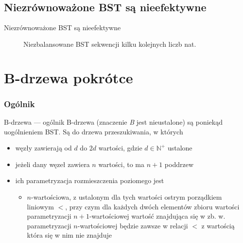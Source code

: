 \documentclass{beamer}
\begin{document}
\subsection{Niezrównoważone BST są nieefektywne}

\begin{frame}{Niezrównoważone BST są nieefektywne}
\begin{figure}
\caption{\label{fig:sequenceunbalancedbst}
Niezbalansowane BST sekwencji kilku kolejnych liczb nat.}
\end{figure}
\end{frame}

\section{B-drzewa pokrótce}

\subsubsection{Ogólnik}

\begin{frame}{B-drzewa --- ogólnik}
	B-drzewa (znaczenie \textit{B} jest nieustalone) są poniekąd uogólnieniem BST.
    Są do drzewa przeszukiwania, w których
    \begin{itemize}
    	\item węzły zawierają od $d$ do $2d$ wartości, gdzie $d\in\mathbb{N}^+$ ustalone
        \item jeżeli dany węzeł zawiera $n$ wartości, to ma $n+1$ poddrzew
        \item ich parametryzacja rozmieszczenia poziomego jest
        \begin{itemize}
        	\item $n$-wartościowa, z ustalonym dla tych wartości ostrym porządkiem
            liniowym $<$, przy czym dla każdych dwóch elementów zbioru wartości parametryzacji 
            $n+1$-wartościowej wartość znajdująca się w zb. w. parametryzacji
            $n$-wartościowej będzie zawsze w relacji $<$ z wartością która się w
            nim nie znajduje
        \end{itemize}
    \end{itemize}
\end{frame}
\end{document}
